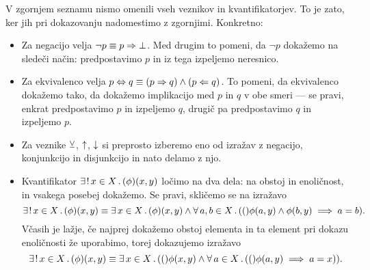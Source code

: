         V zgornjem seznamu nismo omenili vseh veznikov in kvantifikatorjev. To je zato, ker jih pri dokazovanju nadomestimo z zgornjimi. Konkretno:
        \begin{itemize}
                \item
                        Za negacijo velja $\lnot{p} \equiv p \Rightarrow \bot$. Med drugim to pomeni, da $\lnot{p}$ dokažemo na sledeči način: predpostavimo $p$ in iz tega izpeljemo neresnico.
                \item
                        Za ekvivalenco velja $p \Leftrightarrow q \equiv (p \Rightarrow q) \land (p \Leftarrow q)$. To pomeni, da ekvivalenco dokažemo tako, da dokažemo implikacijo med $p$ in $q$ v obe smeri --- se pravi, enkrat predpostavimo $p$ in izpeljemo $q$, drugič pa predpostavimo $q$ in izpeljemo $p$.
                \item
                        Za veznike $\mathbin{\veebar}$, $\mathbin{\uparrow}$, $\mathbin{\downarrow}$ si preprosto izberemo eno od izražav z negacijo, konjunkcijo in disjunkcijo in nato delamo z njo.
                \item
                        Kvantifikator $\exactlyone{x \in X} \phi(x, y)$ ločimo na dva dela: na obstoj in enoličnost, in vsakega posebej dokažemo. Se pravi, skličemo se na izražavo
                        \[\exactlyone{x \in X} \phi(x, y) \equiv \some{x \in X} \phi(x, y) \land \all{a, b \in X} (\phi(a, y) \land \phi(b, y) \implies a = b).\]
                        Včasih je lažje, če najprej dokažemo obstoj elementa in ta element pri dokazu enoličnosti že uporabimo, torej dokazujemo izražavo
                        \[\exactlyone{x \in X} \phi(x, y) \equiv \some{x \in X} (\phi(x, y) \land \all{a \in X} (\phi(a, y) \implies a = x)).\]
        \end{itemize}

